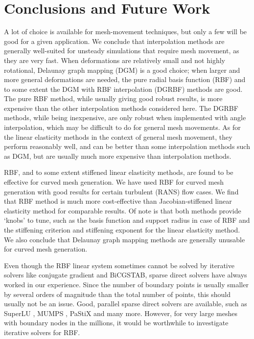 \chapter{Conclusions and Future Work}

A lot of choice is available for mesh-movement techniques, but only a few will be good for a given application. We conclude that interpolation methods are generally well-suited for unsteady simulations that require mesh movement, as they are very fast. When deformations are relatively small and not highly rotational, Delaunay graph mapping (DGM) is a good choice; when larger and more general deformations are needed, the pure radial basis function (RBF) and to some extent the DGM with RBF interpolation (DGRBF) methods are good. The pure RBF method, while usually giving good robust results, is more expensive than the other interpolation methods considered here. The DGRBF methods, while being inexpensive, are only robust when implemented with angle interpolation, which may be difficult to do for general mesh movements. As for the linear elasticity methods in the context of general mesh movement, they perform reasonably well, and can be better than some interpolation methods such as DGM, but are usually much more expensive than interpolation methods.

RBF, and to some extent stiffened linear elasticity methods, are found to be effective for curved mesh generation. We have used RBF for curved mesh generation with good results for certain turbulent (RANS) flow cases. We find that RBF method is much more cost-effective than Jacobian-stiffened linear elasticity method for comparable results. Of note is that both methods provide `knobs' to tune, such as the basis function and support radius in case of RBF and the stiffening criterion and stiffening exponent for the linear elasticity method. We also conclude that Delaunay graph mapping methods are generally unusable for curved mesh generation.

Even though the RBF linear system sometimes cannot be solved by iterative solvers like conjugate gradient and BiCGSTAB, sparse direct solvers have always worked in our experience. Since the number of boundary points is usually smaller by several orders of magnitude than the total number of points, this should usually not be an issue. Good, parallel sparse direct solvers are available, such as SuperLU \cite{superlu}, MUMPS \cite{MUMPS}, PaStiX \cite{pastix} and many more. However, for very large meshes with boundary nodes in the millions, it would be worthwhile to investigate iterative solvers for RBF.

